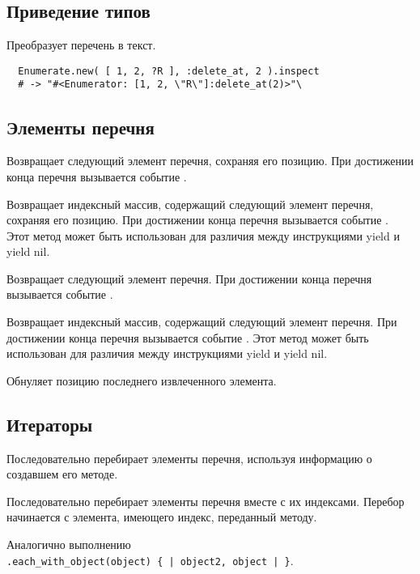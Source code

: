\subsection*{Приведение типов}

\begin{methodlist}
  Преобразует перечень в текст. 
  \begin{verbatim}
  Enumerate.new( [ 1, 2, ?R ], :delete_at, 2 ).inspect 
  # -> "#<Enumerator: [1, 2, \"R\"]:delete_at(2)>"\
  \end{verbatim}
\end{methodlist}

\subsection*{Элементы перечня}

\begin{methodlist}
  Возвращает следующий элемент перечня, сохраняя его позицию. При достижении конца перечня вызывается событие . 
 
  Возвращает индексный массив, содержащий следующий элемент перечня, сохраняя его позицию. При достижении конца перечня вызывается событие . Этот метод может быть использован для различия между инструкциями yield и yield nil. 
 
  Возвращает следующий элемент перечня. При достижении конца перечня вызывается событие . 
 
  Возвращает индексный массив, содержащий следующий элемент перечня. При достижении конца перечня вызывается событие . Этот метод может быть использован для различия между инструкциями yield и yield nil. 
 
  Обнуляет позицию последнего извлеченного элемента.
\end{methodlist}

\subsection*{Итераторы}

\begin{methodlist}
  Последовательно перебирает элементы перечня, используя информацию о создавшем его методе. 
 
  Последовательно перебирает элементы перечня вместе с их индексами. Перебор начинается с элемента, имеющего индекс, переданный методу.
 
  Аналогично выполнению 
  \\\verb!.each_with_object(object) { | object2, object | }!.
\end{methodlist}

